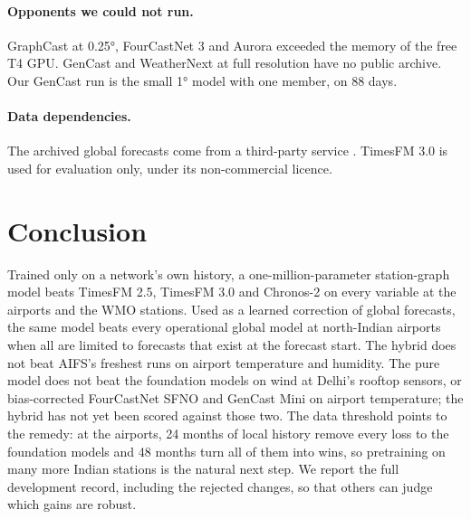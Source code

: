 \paragraph{Opponents we could not run.}
GraphCast at 0.25°, FourCastNet 3 and Aurora exceeded the memory of the free T4 GPU. GenCast and WeatherNext at full
resolution have no public archive. Our GenCast run is the small 1° model with one member, on 88 days.

\paragraph{Data dependencies.}
The archived global forecasts come from a third-party service \citep{openmeteo}. TimesFM 3.0 is used for evaluation
only, under its non-commercial licence.

\section{Conclusion}

Trained only on a network's own history, a one-million-parameter station-graph model beats TimesFM 2.5, TimesFM 3.0
and Chronos-2 on every variable at the airports and the WMO stations.
Used as a learned correction of global forecasts, the same model beats every operational global model at
north-Indian airports when all are limited to forecasts that exist at the forecast start. The hybrid does not beat AIFS's
freshest runs on airport temperature and humidity. The pure model does not beat the foundation models on wind at
Delhi's rooftop sensors, or bias-corrected FourCastNet SFNO and GenCast Mini on airport temperature; the hybrid has
not yet been scored against those two. The data threshold points to the remedy: at the airports, 24 months of local
history remove every loss to the foundation models and 48 months turn all of them into wins, so pretraining on
many more Indian stations is the natural next step. We report the full development record, including
the rejected changes, so that others can judge which gains are robust.

